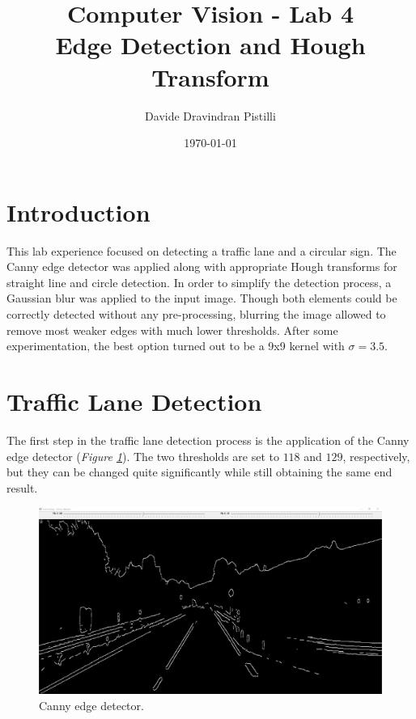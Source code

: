 \documentclass{article}
\title{Computer Vision - Lab 4 \\ Edge Detection and Hough Transform} %
\author{Davide Dravindran Pistilli} %
\date{\today} %
\begin{document}
\maketitle %

\section{Introduction}
This lab experience focused on detecting a traffic lane and a circular sign. The Canny edge detector was applied along with appropriate Hough transforms for straight line and circle detection.
In order to simplify the detection process, a Gaussian blur was applied to the input image. Though both elements could be correctly detected without any pre-processing, blurring the image allowed to remove most weaker edges with much lower thresholds. After some experimentation, the best option turned out to be a 9x9 kernel with $\sigma=3.5$.

\section{Traffic Lane Detection}
The first step in the traffic lane detection process is the application of the Canny edge detector (\textit{Figure \ref{img_canny}}). The two thresholds are set to $118$ and $129$, respectively, but they can be changed quite significantly while still obtaining the same end result.

\begin{figure}[h]
\begin{center}
\includegraphics[width=1\textwidth]{images/canny}
\caption{\footnotesize{Canny edge detector.}}
\label{img_canny}
\end{center}
\end{figure}
\end{document}
